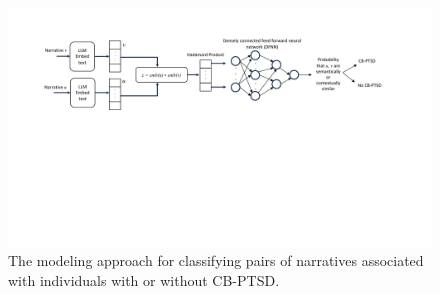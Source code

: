 \documentclass[bst/sn-nature]{sn-jnl}%
\theoremstyle{thmstyleone}%
\theoremstyle{thmstyletwo}%
\theoremstyle{thmstylethree}%
\begin{document}
\begin{appendices}
\begin{figure}
    \centering
    \includegraphics[scale=0.5, trim={0cm 0cm 0cm 0cm}, clip]{images/model.pdf}
    \caption{The modeling approach for classifying pairs of narratives associated with individuals with or without CB-PTSD.}
    \label{fig:dfnn}
\end{figure}





\end{appendices}


 
\end{document}
